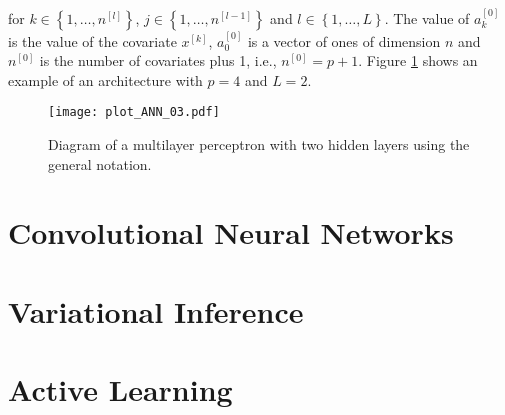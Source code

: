for $k \in \left\{ 1, \ldots, n^{[l]} \right\}$, $j \in \left\{ 1, \ldots, n^{[l-1]} \right\}$ and $l \in \left\{ 1, \ldots, L \right\}$. The value of $a_k^{[0]}$ is the value of the covariate $x^{[k]}$, $a_0^{[0]}$ is a vector of ones of dimension $n$ and $n^{[0]}$ is the number of covariates plus 1, i.e., $n^{[0]} = p + 1$. Figure \ref{fig:theory_ANN_diagram_03} shows an example of an architecture with $p = 4$ and $L = 2$.

\begin{figure}[H]
    \centering
    \texttt{[image: plot\_ANN\_03.pdf]}
    \caption{Diagram of a multilayer perceptron with two hidden layers using the general notation.}
    \label{fig:theory_ANN_diagram_03}
\end{figure}

\section{Convolutional Neural Networks}

\section{Variational Inference}

\section{Active Learning}
